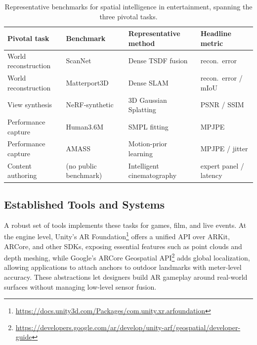 \begin{table}[!th]
\centering
\fontsize{8}{10}\selectfont
\setlength{\tabcolsep}{1.0mm}
\caption{Representative benchmarks for spatial intelligence in entertainment, spanning the three pivotal tasks.}
\label{tab:p4_s10_2_benchmarks}
\begin{tabular}{L{0.19\textwidth} L{0.22\textwidth} L{0.30\textwidth} L{0.20\textwidth}}
\toprule
\textbf{Pivotal task} & \textbf{Benchmark} & \textbf{Representative method} & \textbf{Headline metric} \\
\midrule
World reconstruction & ScanNet~\cite{dai2017scannet} & Dense TSDF fusion~\cite{newcombe2011kinectfusion} & recon.\ error \\
World reconstruction & Matterport3D~\cite{chang2017matterport3d} & Dense SLAM & recon.\ error / mIoU \\
View synthesis & NeRF-synthetic~\cite{mildenhall2021nerf} & 3D Gaussian Splatting~\cite{kerbl20233d} & PSNR / SSIM \\
Performance capture & Human3.6M~\cite{IonescuPOS14} & SMPL fitting~\cite{loper2015smpl} & MPJPE \\
Performance capture & AMASS~\cite{mahmood2019amass} & Motion-prior learning & MPJPE / jitter \\
Content authoring & (no public benchmark) & Intelligent cinematography~\cite{azzarelli2025intelligentcine} & expert panel / latency \\
\bottomrule
\end{tabular}
\end{table}

\subsection{Established Tools and Systems}
\label{subsec:p4-sec10-2-established-tools-and-systems}

A robust set of tools implements these tasks for games, film, and live events. At the engine level, Unity's AR Foundation\footnote{\url{https://docs.unity3d.com/Packages/com.unity.xr.arfoundation}} offers a unified API over ARKit, ARCore, and other SDKs, exposing essential features such as point clouds and depth meshing, while Google's ARCore Geospatial API\footnote{\url{https://developers.google.com/ar/develop/unity-arf/geospatial/developer-guide}} adds global localization, allowing applications to attach anchors to outdoor landmarks with meter-level accuracy.
These abstractions let designers build AR gameplay around real-world surfaces without managing low-level sensor fusion.

